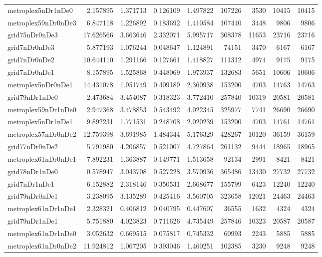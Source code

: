 \begin{longtable}{|l|r|r|r|r|r|r|r|r|}
metroplex5nDr1nDe0 & 2.157895 & 1.371713 & 0.126109 & 1.497822 & 107226 & 3530 & 10415 & 10415 \\
metroplex59nDr0nDe3 & 6.847118 & 1.226892 & 0.183692 & 1.410584 & 107440 & 3448 & 9806 & 9806 \\
grid75nDr0nDe3 & 17.626566 & 3.663646 & 2.332071 & 5.995717 & 308378 & 11653 & 23716 & 23716 \\
grid7nDr0nDe3 & 5.877193 & 1.076244 & 0.048647 & 1.124891 & 74151 & 3470 & 6167 & 6167 \\
grid7nDr0nDe2 & 10.644110 & 1.291166 & 0.127661 & 1.418827 & 111312 & 4974 & 9175 & 9175 \\
grid7nDr0nDe1 & 8.157895 & 1.525868 & 0.448069 & 1.973937 & 132683 & 5651 & 10606 & 10606 \\
metroplex5nDr0nDe1 & 14.431078 & 1.951749 & 0.409189 & 2.360938 & 153200 & 4703 & 14763 & 14763 \\
grid79nDr1nDe0 & 2.473684 & 3.454087 & 0.318323 & 3.772410 & 257840 & 10319 & 20581 & 20581 \\
metroplex59nDr1nDe0 & 2.947368 & 3.478853 & 0.543492 & 4.022345 & 325977 & 7741 & 26690 & 26690 \\
metroplex5nDr1nDe1 & 9.892231 & 1.771531 & 0.248708 & 2.020239 & 153200 & 4703 & 14761 & 14761 \\
metroplex57nDr0nDe2 & 12.759398 & 3.691985 & 1.484344 & 5.176329 & 428267 & 10120 & 36159 & 36159 \\
grid77nDr0nDe2 & 5.791980 & 4.206857 & 0.521007 & 4.727864 & 261132 & 9444 & 18965 & 18965 \\
metroplex61nDr0nDe1 & 7.892231 & 1.363887 & 0.149771 & 1.513658 & 92134 & 2991 & 8421 & 8421 \\
grid78nDr1nDe0 & 0.578947 & 3.043708 & 0.527228 & 3.570936 & 365486 & 13430 & 27732 & 27732 \\
grid7nDr1nDe1 & 6.152882 & 2.318146 & 0.350531 & 2.668677 & 155799 & 6423 & 12240 & 12240 \\
grid79nDr0nDe1 & 3.238095 & 3.135289 & 0.425416 & 3.560705 & 323658 & 12021 & 24463 & 24463 \\
metroplex61nDr1nDe1 & 2.328321 & 0.406812 & 0.040795 & 0.447607 & 36555 & 1632 & 4324 & 4324 \\
grid79nDr1nDe1 & 5.751880 & 4.023823 & 0.711626 & 4.735449 & 257846 & 10323 & 20587 & 20587 \\
metroplex61nDr1nDe0 & 3.052632 & 0.669515 & 0.075817 & 0.745332 & 60993 & 2243 & 5885 & 5885 \\
metroplex61nDr0nDe2 & 11.924812 & 1.067205 & 0.393046 & 1.460251 & 102385 & 3230 & 9248 & 9248 \\

\end{longtable}
